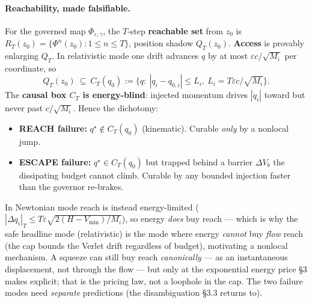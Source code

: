 \documentclass[11pt]{article}
\begin{document}
\paragraph{Reachability, made falsifiable.} For the governed map $\Phi_{\varepsilon,\gamma}$, the $T$-step \textbf{reachable set} from $z_0$ is $R_T(z_0)=\{\Phi^n(z_0):1\le n\le T\}$, position shadow $Q_T(z_0)$. \textbf{Access} is provably enlarging $Q_T$. In relativistic mode one drift advances $q$ by at most $\varepsilon c/\sqrt{M_i}$ per coordinate, so
\[
Q_T(z_0)\ \subseteq\ C_T(q_0):=\{q:\ |q_i-q_{0,i}|\le L_i,\ L_i=T\varepsilon c/\sqrt{M_i}\}.
\]
The \textbf{causal box $C_T$ is energy-blind}: injected momentum drives $|\dot q_i|$ toward but never past $c/\sqrt{M_i}$. Hence the dichotomy:
\begin{itemize}\itemsep1pt
\item \textbf{REACH failure:} $q^\star\notin C_T(q_0)$ (kinematic). Curable \emph{only} by a nonlocal jump.
\item \textbf{ESCAPE failure:} $q^\star\in C_T(q_0)$ but trapped behind a barrier $\Delta V_b$ the dissipating budget cannot climb. Curable by any bounded injection faster than the governor re-brakes.
\end{itemize}
In Newtonian mode reach is instead energy-limited ($|\Delta q_i|_T\le T\varepsilon\sqrt{2(H-V_{\min})/M_i}$), so energy \emph{does} buy reach --- which is why the safe headline mode (relativistic) is the mode where energy \emph{cannot} buy \emph{flow} reach (the cap bounds the Verlet drift regardless of budget), motivating a nonlocal mechanism. A squeeze can still buy reach \emph{canonically} --- as an instantaneous displacement, not through the flow --- but only at the exponential energy price \S3 makes explicit; that is the pricing law, not a loophole in the cap. The two failure modes need \emph{separate} predictions (the disambiguation \S3.3 returns to).
\end{document}
